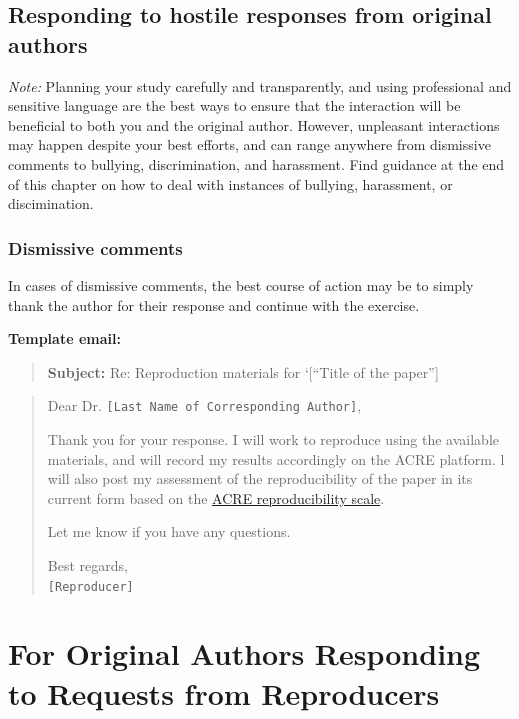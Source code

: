 \documentclass[]{book}
\begin{document}
\hypertarget{responding-to-hostile-responses-from-original-authors}{%
\subsection{Responding to hostile responses from original authors}\label{responding-to-hostile-responses-from-original-authors}}

\emph{Note:} Planning your study carefully and transparently, and using professional and sensitive language are the best ways to ensure that the interaction will be beneficial to both you and the original author. However, unpleasant interactions may happen despite your best efforts, and can range anywhere from dismissive comments to bullying, discrimination, and harassment. Find guidance at the end of this chapter on how to deal with instances of bullying, harassment, or discimination.

\hypertarget{dismissive-comments}{%
\subsubsection{Dismissive comments}\label{dismissive-comments}}

In cases of dismissive comments, the best course of action may be to simply thank the author for their response and continue with the exercise.

\textbf{Template email:}

\begin{quote}
\textbf{Subject:} Re: Reproduction materials for `{[}``Title of the paper''{]}
\end{quote}

\begin{quote}
Dear Dr. \texttt{{[}Last\ Name\ of\ Corresponding\ Author{]}},

Thank you for your response. I will work to reproduce using the available materials, and will record my results accordingly on the ACRE platform. l will also post my assessment of the reproducibility of the paper in its current form based on the \href{https://bitss.github.io/ACRE/assessment.html\#levels-of-computational-reproducibility-for-a-specific-output}{ACRE reproducibility scale}.

Let me know if you have any questions.

Best regards,\\
\texttt{{[}Reproducer{]}}
\end{quote}

\hypertarget{for-original-authors-responding-to-requests-from-reproducers}{%
\section{For Original Authors Responding to Requests from Reproducers}\label{for-original-authors-responding-to-requests-from-reproducers}}
\end{document}
